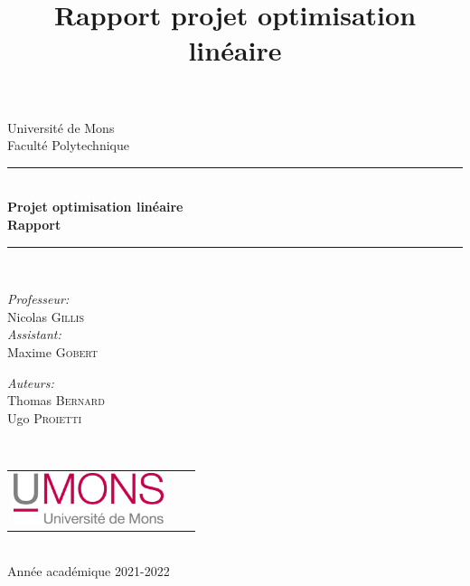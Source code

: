 \documentclass{article}
\title{Rapport projet optimisation linéaire}
\author{ }
\date{ }
\begin{document}
\begin{titlepage}
    \begin{center}
        
        {\Large Université de Mons}\\[1ex]
        {\Large Faculté Polytechnique}\\[1ex]
        
        \newcommand{\HRule}{\rule{\linewidth}{0.3mm}}
        \HRule \\[0.3cm]
        { \LARGE \bfseries Projet optimisation linéaire \\[0.3cm]}
        { \LARGE \bfseries Rapport \\[0.1cm]} %
        \HRule \\[1.5cm]
        
        \begin{minipage}[t]{0.45\textwidth}
            \begin{flushleft} \large
                \emph{Professeur:}\\
                Nicolas \textsc{Gillis}\\
                \emph{Assistant:}\\
                Maxime \textsc{Gobert}\\
            \end{flushleft}
        \end{minipage}
        \begin{minipage}[t]{0.45\textwidth}
            \begin{flushright} \large
                \emph{Auteurs:} \\
                Thomas \textsc{Bernard} \\
                Ugo \textsc{Proietti} \\
            \end{flushright}
        \end{minipage}\\[2ex]
        
        \vfill
        
        \begin{center}
            \begin{tabular}[t]{c c c}
                \includegraphics[height=1.5cm]{images/logoumons.jpg} &
                \hspace{0.3cm} &
            \end{tabular}
        \end{center}~\\
        
        {\large Année académique 2021-2022}
        
    \end{center}
\end{titlepage}
\end{document}
